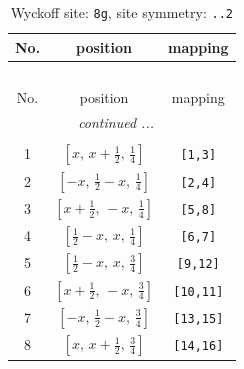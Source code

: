 \documentclass[fleqn,8pt]{jsarticle}
\begin{document}
\begin{longtable}{ccc}
\caption{Wyckoff site: {\tt 8g}, site symmetry: {\tt ..2}}
 \\
 \hline \hline
No. & position & mapping \\ \hline \endfirsthead

\multicolumn{2}{l}{\tablename\ \thetable{}} \\
 \hline \hline
No. & position & mapping \\ \hline \endhead

 \hline \hline
\multicolumn{2}{r}{\footnotesize\it continued ...} \\ \endfoot

 \hline \hline
\multicolumn{2}{r}{} \\ \endlastfoot

1 & $\left[ x,\, x + \frac{1}{2},\, \frac{1}{4} \right]$ & {\tt [1,3]} \\ \hline
2 & $\left[ - x,\, \frac{1}{2} - x,\, \frac{1}{4} \right]$ & {\tt [2,4]} \\ \hline
3 & $\left[ x + \frac{1}{2},\, - x,\, \frac{1}{4} \right]$ & {\tt [5,8]} \\ \hline
4 & $\left[ \frac{1}{2} - x,\, x,\, \frac{1}{4} \right]$ & {\tt [6,7]} \\ \hline
5 & $\left[ \frac{1}{2} - x,\, x,\, \frac{3}{4} \right]$ & {\tt [9,12]} \\ \hline
6 & $\left[ x + \frac{1}{2},\, - x,\, \frac{3}{4} \right]$ & {\tt [10,11]} \\ \hline
7 & $\left[ - x,\, \frac{1}{2} - x,\, \frac{3}{4} \right]$ & {\tt [13,15]} \\ \hline
8 & $\left[ x,\, x + \frac{1}{2},\, \frac{3}{4} \right]$ & {\tt [14,16]} \\
\end{longtable}
\renewcommand{\arraystretch}{1.2}
\end{document}
